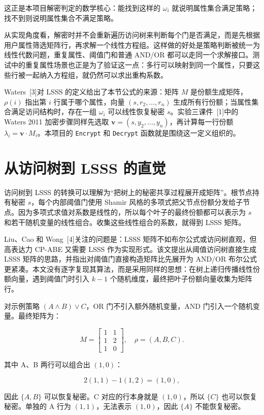 这正是本项目解密判定的数学核心：能找到这样的 $\omega_i$ 就说明属性集合满足策略；找不到则说明属性集合不满足策略。

从实现角度看，解密时并不会重新遍历访问树来判断每个门是否满足，而是先根据用户属性筛选矩阵行，再求解一个线性方程组。这样做的好处是策略判断被统一为线性代数问题，重复属性、阈值门和普通 AND/OR 都可以走同一个求解接口。测试中的重复属性场景也正是为了验证这一点：多行可以映射到同一个属性，只要这些行被一起纳入方程组，就仍然可以求出重构系数。

Waters~[3]对 LSSS 的定义给出了本节公式的来源：矩阵 $M$ 是份额生成矩阵，$\rho(i)$ 指出第 $i$ 行属于哪个属性，向量 $(s,r_2,\dots,r_n)$ 生成所有行份额；当属性集合满足访问结构时，存在一组 $\omega_i$ 可以线性恢复秘密 $s$。实验三课件~[1]中的 Waters 2011 加密步骤同样先选取 $\mathbf{v}=(s,y_2,\dots,y_n)$，再计算每一行份额 $\lambda_i=\mathbf{v}\cdot M_i$。本项目的 \verb|Encrypt| 和 \verb|Decrypt| 函数就是围绕这一定义组织的。

\section{从访问树到 LSSS 的直觉}

访问树到 LSSS 的转换可以理解为“把树上的秘密共享过程展开成矩阵”。根节点持有秘密 $s$，每个内部阈值门使用 Shamir 风格的多项式把父节点份额分发给子节点。因为多项式求值对系数是线性的，所以每个叶子的最终份额都可以表示为 $s$ 和若干随机变量的线性组合。收集这些线性组合的系数，就得到 LSSS 矩阵。

Liu、Cao 和 Wong~[4]关注的问题是：LSSS 矩阵不如布尔公式或访问树直观，但高表达力 CP-ABE 又需要 LSSS 作为实现形式。该文提出从阈值访问树直接生成 LSSS 矩阵的思路，并指出对阈值门直接构造矩阵比先展开为 AND/OR 布尔公式更紧凑。本文没有逐字复现其算法，而是采用同样的思想：在树上递归传播线性份额向量，遇到阈值门时引入 $k-1$ 个随机维度，最终把叶子份额向量收集为矩阵行。

对示例策略 $(A\wedge B)\vee C$，OR 门不引入额外随机变量，AND 门引入一个随机变量。最终矩阵为：

\[
M=
\begin{bmatrix}
1 & 1\\
1 & 2\\
1 & 0
\end{bmatrix},
\quad
\rho=(A,B,C).
\]

其中 A、B 两行可以组合出 $(1,0)$：

\[
2(1,1)-1(1,2)=(1,0),
\]

因此 $\{A,B\}$ 可以恢复秘密。C 对应的行本身就是 $(1,0)$，所以 $\{C\}$ 也可以恢复秘密。单独的 A 行为 $(1,1)$，无法表示 $(1,0)$，因此 $\{A\}$ 不能恢复秘密。

